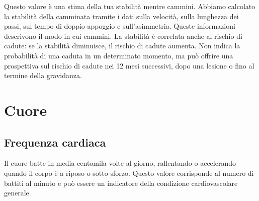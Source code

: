 \documentclass{article}
\begin{document}
\begin{center}
\end{center}
Questo valore è una stima della tua stabilità mentre cammini. Abbiamo calcolato la stabilità della camminata tramite i dati sulla velocità, sulla lunghezza dei passi, sul tempo di doppio appoggio e sull'asimmetria.
Queste informazioni descrivono il modo in cui cammini.
La stabilità è correlata anche al rischio di cadute: se la stabilità diminuisce, il rischio di cadute aumenta. Non indica la probabilità di una caduta in un determinato momento, ma può offrire una prospettiva sul rischio di cadute nei 12 mesi successivi, dopo una lesione o fino al termine della gravidanza.


\section{Cuore}

\subsection{Frequenza cardiaca}
Il cuore batte in media centomila volte al giorno, rallentando o accelerando quando il corpo è a riposo o sotto sforzo. Questo valore corrisponde al numero di battiti al minuto e può essere un indicatore della condizione cardiovascolare generale. 

\begin{center}
\end{center}
\end{document}

